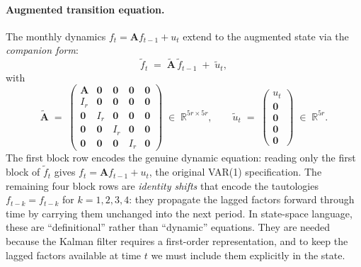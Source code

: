 \documentclass[11pt, a4paper, oneside]{article}
\newcommand{\mA}{\mathbf{A}}
\begin{document}
\paragraph{Augmented transition equation.}
The monthly dynamics $f_t = \mA f_{t-1} + u_t$ extend to the augmented
state via the \emph{companion form}:
\begin{equation}
\tilde{f}_t \;=\; \tilde{\mA}\, \tilde{f}_{t-1} \;+\; \tilde{u}_t,
\label{eq:mm-augmented-transition}
\end{equation}
with
\[
\tilde{\mA} \;=\; \begin{pmatrix}
\mA & \mathbf{0} & \mathbf{0} & \mathbf{0} & \mathbf{0} \\
I_r & \mathbf{0} & \mathbf{0} & \mathbf{0} & \mathbf{0} \\
\mathbf{0} & I_r & \mathbf{0} & \mathbf{0} & \mathbf{0} \\
\mathbf{0} & \mathbf{0} & I_r & \mathbf{0} & \mathbf{0} \\
\mathbf{0} & \mathbf{0} & \mathbf{0} & I_r & \mathbf{0}
\end{pmatrix} \;\in\; \mathbb{R}^{5r \times 5r},
\qquad
\tilde{u}_t \;=\; \begin{pmatrix} u_t \\ \mathbf{0} \\ \mathbf{0} \\ \mathbf{0} \\ \mathbf{0} \end{pmatrix} \;\in\; \mathbb{R}^{5r}.
\]
The first block row encodes the genuine dynamic equation: reading
only the first block of $\tilde{f}_t$ gives $f_t = \mA f_{t-1} + u_t$,
the original VAR(1) specification. The remaining four block rows are
\emph{identity shifts} that encode the tautologies
$f_{t-k} = f_{t-k}$ for $k = 1, 2, 3, 4$: they propagate the lagged
factors forward through time by carrying them unchanged into the next
period. In state-space language, these are ``definitional'' rather
than ``dynamic'' equations. They are needed because the Kalman filter
requires a first-order representation, and to keep the lagged factors
available at time $t$ we must include them explicitly in the state.
\end{document}
